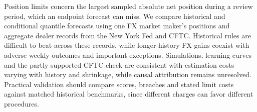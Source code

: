 Position limits concern the largest sampled absolute net position during a review period, which an endpoint forecast can miss. We compare historical and conditional quantile forecasts using one FX market maker's positions and aggregate dealer records from the New York Fed and CFTC. Historical rules are difficult to beat across these records, while longer-history FX gains coexist with adverse weekly outcomes and important exceptions. Simulations, learning curves and the partly supported CFTC check are consistent with estimation costs varying with history and shrinkage, while causal attribution remains unresolved. Practical validation should compare scores, breaches and stated limit costs against matched historical benchmarks, since different charges can favor different procedures.
